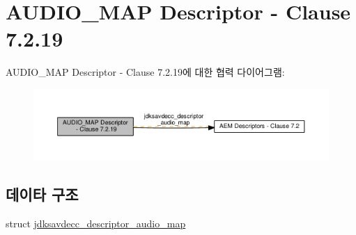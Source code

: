 \hypertarget{group__descriptor__audio__map}{}\section{A\+U\+D\+I\+O\+\_\+\+M\+AP Descriptor -\/ Clause 7.2.19}
\label{group__descriptor__audio__map}
A\+U\+D\+I\+O\+\_\+\+M\+AP Descriptor -\/ Clause 7.2.19에 대한 협력 다이어그램\+:
\nopagebreak
\begin{figure}[H]
\begin{center}
\leavevmode
\includegraphics[width=350pt]{group__descriptor__audio__map}
\end{center}
\end{figure}
\subsection*{데이타 구조}
\begin{DoxyCompactItemize}
\item 
struct \hyperlink{structjdksavdecc__descriptor__audio__map}{jdksavdecc\+\_\+descriptor\+\_\+audio\+\_\+map}
\end{DoxyCompactItemize}
